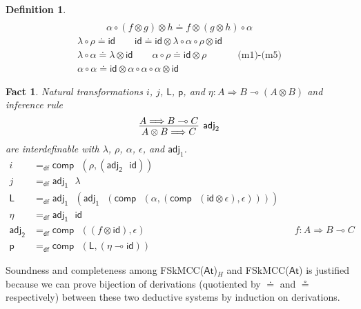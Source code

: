 \documentclass[submission,copyright,creativecommons]{eptcs}
\newtheorem{defn}[theorem]{Definition}
\newtheorem{fact}[theorem]{Fact}
\newcommand{\id}{\mathsf{id}}
\newcommand{\ot}{\otimes}
\newcommand{\lolli}{\multimap}
\newcommand{\msfL}{\mathsf{L}}
\newcommand{\defeq}{=_{\mathsf{df}}}
\newcommand{\comp}{\mathsf{comp}}
\begin{document}
\begin{defn}
\begin{align*}
        \\
        \alpha \circ (f \ot g) \ot h \doteq f \ot (g \ot h) \circ \alpha
    \end{align*}
    \begin{align*}
        \lambda \circ \rho \doteq \id \qquad \id \doteq \id \ot \lambda \circ \alpha \circ \rho \ot \id
        \\
        \lambda \circ \alpha \doteq \lambda \ot \id \qquad \alpha \circ \rho \doteq \id \ot \rho
        &&\text{(m1)-(m5)}
        \\
        \alpha \circ \alpha \doteq
        \id \ot \alpha \circ \alpha \circ \alpha \ot \id
    \end{align*}
  \end{defn}
\begin{fact}
  Natural transformations $i$, $j$, $\msfL$, $\mathsf{p}$, and $\eta : A \Longrightarrow B \lolli (A \ot B)$ and inference rule
  \begin{displaymath}
    \infer[\mathsf{adj}_{2}]{A \ot B \Longrightarrow C}{A \Longrightarrow B \lolli C}
  \end{displaymath}
   are interdefinable with $\lambda$, $\rho$, $\alpha$, $\epsilon$, and $\mathsf{adj}_{1}$.
  \begin{align*}
    i &\defeq \mathsf{comp} \text{ } (\rho ,  (\mathsf{adj_2} \text{ } \id))
    \\
    j &\defeq \mathsf{adj_1} \text{ } \lambda
    \\
    \msfL &\defeq \mathsf{adj_1} \text{ } (\mathsf{adj_1} \text{ } (\mathsf{comp} \text{ } (\alpha , (\mathsf{comp} \text{ } (\id \ot \epsilon) , \epsilon))))
    \\
    \eta &\defeq \mathsf{adj_1} \text{ } \id
    \\
    \mathsf{adj_2} &\defeq \comp \text{ } ((f \ot \id), \epsilon) && f : A \Longrightarrow B \lolli C
    \\
    \mathsf{p} &\defeq \comp \text{ } (\msfL , (\eta \lolli \id))
  \end{align*}
\end{fact}
Soundness and completeness among FSkMCC($\mathsf{At}$)$_{H}$ and FSkMCC($\mathsf{At}$) is justified because we can prove bijection of derivations (quotiented by $\doteq$ and $\circeq$ respectively) between these two deductive systems by induction on derivations.
\end{document}
